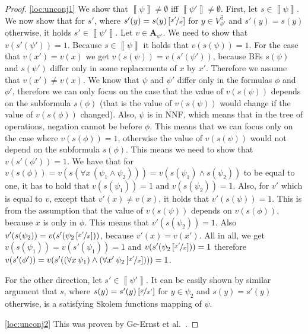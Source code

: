\documentclass[
  digital, %
  twoside, %
  table,   %
  nolof,     %
  nolot,     %
]{fithesis3}
\theoremstyle{definition}
\theoremstyle{remark}
\newcommand{\seman}[1]{\left\llbracket {#1} \right\rrbracket}
\newcommand{\substitute}[2]{\left[ \nicefrac{#2}{#1} \right]}
\newcommand{\valtns}[1]{\mathbf{A}_{#1}}
\newcommand{\evars}[1]{V_{#1}^{\exists}}
\newcommand{\itholds}{\,}
\begin{document}
\begin{proof}
  \eqref{loc:unconj1} We show that $\seman{\psi} \not= \emptyset$ iff $\seman{\psi'} \not= \emptyset$. First, let $s \in \seman{\psi}$. We now show that for $s'$, where $s'(y) = s(y)\substitute{x}{x'}$ for $y \in \evars{\phi'}$ and $s'(y) = s(y)$ otherwise, it holds $s' \in \seman{\psi'}$. Let $v \in \valtns{\psi'}$. We need to show that $v(s'(\psi')) = 1$. Because $s \in \seman{\psi}$ it holds that $v(s(\psi)) = 1$. For the case that $v(x') = v(x)$ we get $v(s(\psi)) = v(s'(\psi'))$, because BFs $s(\psi)$ and $s(\psi')$ differ only in some replacements of $x$ by $x'$. Therefore we assume that $v(x') \not= v(x)$. We know that $\psi$ and $\psi'$ differ only in the formulas $\phi$ and $\phi'$, therefore we can only focus on the case that the value of $v(s(\psi))$ depends on the subformula $s(\phi)$ (that is the value of $v(s(\psi))$ would change if the value of $v(s(\phi))$ changed). Also, $\psi$ is in NNF, which means that in the tree of operations, negation cannot be before $\phi$. This means that we can focus only on the case where $v(s(\phi)) = 1$, otherwise the value of $v(s(\psi))$ would not depend on the subformula $s(\phi)$. This means we need to show that $v(s'(\phi')) = 1$. We have that for $v(s(\phi)) = v(s(\forall x \itholds (\psi_1 \land \psi_2))) = v(s(\psi_1) \land s(\psi_2))$ to be equal to one, it has to hold that $v(s(\psi_1)) = 1$ and $v(s(\psi_2)) = 1$. Also, for $v'$ which is equal to $v$, except that $v'(x) \not= v(x)$, it holds that $v'(s(\psi)) = 1$. This is from the assumption that the value of $v(s(\psi))$ depends on $v(s(\phi))$, because $x$ is only in $\phi$. This means that $v'(s(\psi_2)) = 1$. Also $v'(s(\psi_2)) = v(s'(\psi_2\substitute{x}{x'}))$, because $v'(x) = v(x')$. All in all, we get $v(s(\psi_1)) = v(s'(\psi_1)) = 1$ and $v(s'(\psi_2\substitute{x}{x'})) = 1$ therefore $v(s'(\phi')) = v(s'((\forall x \itholds \psi_1) \land (\forall x' \itholds \psi_2\substitute{x}{x'}))) = 1$.
  
  For the other direction, let $s' \in \seman{\psi'}$. It can be easily shown by similar argument that $s$, where $s(y) = s'(y)\substitute{x'}{x}$ for $y \in \psi_2$ and $s(y) = s'(y)$ otherwise, is a satisfying Skolem functions mapping of $\psi$.
  
  \eqref{loc:unconj2} This was proven by Ge-Ernst et al.~\cite[Theorem 4]{HQSquantifierLocalization}.
  
  

\end{proof}
\end{document}
